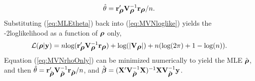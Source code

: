 \documentclass[11pt, titlepage]{article}\usepackage[]{graphicx}\usepackage[]{color}
\begin{document}
\begin{equation}\label{eq:MLEtheta}
 \hat{\theta} = \br\upp_{\brho}\bV\upi_{\brho}\br_{\brho}/n.
\end{equation}
Substituting (\ref{eq:MLEtheta}) back into (\ref{eq:MVNloglike}) yields the -2loglikelihood as a function of $\brho$ only,
\begin{equation}\label{eq:MVNrhoOnly}
\cL(\brho|\by) = n\log(\br\upp_{\brho}\bV\upi_{\brho}\br_{\brho}) + \log(|\bV_{\brho}|) + n(\log(2\pi) + 1 - \log(n)). 
\end{equation}
Equation (\ref{eq:MVNrhoOnly}) can be minimized numerically to yield the MLE $\hat{\brho}$, and then $\hat{\theta} = \br\upp_{\hat{\brho}}\bV\upi_{\hat{\brho}}\br_{\hat{\brho}}/n$, and  $\hat{\bbeta} = (\bX\upp\bV\upi_{\hat{\brho}}\bX)\upi\bX\bV\upi_{\hat{\brho}}\by$.
\end{document}

